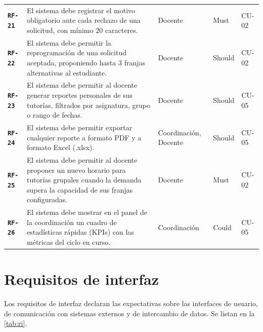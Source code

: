 \documentclass[11pt,a4paper,twoside]{report}
\newcommand{\reqid}[1]{\texttt{\textbf{#1}}}
\begin{document}
\begin{longtable}{@{}p{1.2cm}p{7.5cm}p{2.5cm}p{1.3cm}p{1.5cm}@{}}
    \reqid{RF-21}\label{rf:21} & El sistema debe registrar el motivo obligatorio ante cada rechazo de una solicitud, con m\'inimo 20 caracteres. & Docente & Must & CU-02 \\
    \reqid{RF-22}\label{rf:22} & El sistema debe permitir la reprogramaci\'on de una solicitud aceptada, proponiendo hasta 3 franjas alternativas al estudiante. & Docente & Should & CU-02 \\
    \reqid{RF-23}\label{rf:23} & El sistema debe permitir al docente generar reportes personales de sus tutor\'ias, filtrados por asignatura, grupo o rango de fechas. & Docente & Should & CU-05 \\
    \reqid{RF-24}\label{rf:24} & El sistema debe permitir exportar cualquier reporte a formato PDF y a formato Excel (.xlsx). & Coordinaci\'on, Docente & Should & CU-05 \\
    \reqid{RF-25}\label{rf:25} & El sistema debe permitir al docente proponer un nuevo horario para tutor\'ias grupales cuando la demanda supera la capacidad de sus franjas configuradas. & Docente & Must & CU-02 \\
    \reqid{RF-26}\label{rf:26} & El sistema debe mostrar en el panel de la coordinaci\'on un cuadro de estad\'isticas r\'apidas (KPIs) con las m\'etricas del ciclo en curso. & Coordinaci\'on & Could & CU-05 \\
    \bottomrule
\end{longtable}

\section{Requisitos de interfaz}
\label{sec:ri}

Los requisitos de interfaz declaran las expectativas sobre las interfaces de usuario, de comunicaci\'on con sistemas externos y de intercambio de datos. Se listan en la \cref{tab:ri}.
\end{document}
